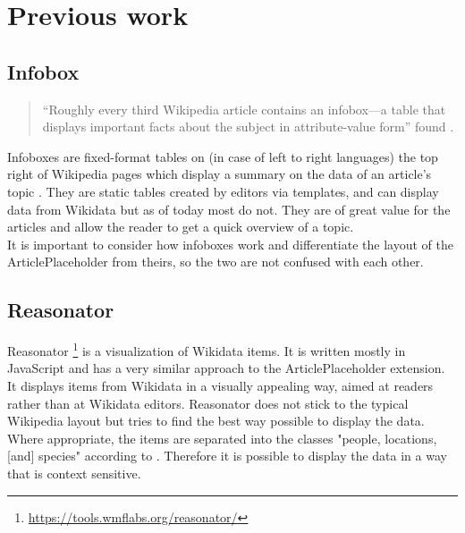 \chapter{Previous work}
\section{Infobox} \label{infobox}
\begin{quote}
	``Roughly every third Wikipedia article contains an infobox---a table that displays important facts about the subject in attribute-value form'' found \citet[5]{infobox}.
\end{quote}
Infoboxes are fixed-format tables on (in case of left to right languages) the top right of Wikipedia pages which display a summary on the data of an article's topic \citep{wiki:05}. They are static tables created by editors via templates, and can display data from Wikidata but as of today most do not. They are of great value for the articles and allow the reader to get a quick overview of a topic. \\
It is important to consider how infoboxes work and differentiate the layout of the ArticlePlaceholder from theirs, so the two are not confused with each other.

\section{Reasonator}
Reasonator \footnote{\url{https://tools.wmflabs.org/reasonator/}} is a visualization of Wikidata items. It is written mostly in JavaScript and has a very similar approach to the ArticlePlaceholder extension. It displays items from Wikidata in a visually appealing way, aimed at readers rather than at Wikidata editors. Reasonator does not stick to the typical Wikipedia layout but tries to find the best way possible to display the data. \\
Where appropriate, the items are separated into the classes  "people, locations, [and] species" according to \citet{wiki:06}. Therefore it is possible to display the data in a way that is context sensitive. \\

